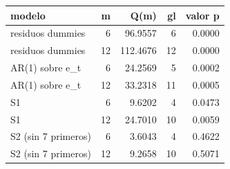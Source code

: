 \begin{tabular}{lrrrr}
\toprule
modelo & m & Q(m) & gl & valor p \\
\midrule
residuos dummies & 6 & 96.9557 & 6 & 0.0000 \\
residuos dummies & 12 & 112.4676 & 12 & 0.0000 \\
AR(1) sobre e\_t & 6 & 24.2569 & 5 & 0.0002 \\
AR(1) sobre e\_t & 12 & 33.2318 & 11 & 0.0005 \\
S1 & 6 & 9.6202 & 4 & 0.0473 \\
S1 & 12 & 24.7010 & 10 & 0.0059 \\
S2 (sin 7 primeros) & 6 & 3.6043 & 4 & 0.4622 \\
S2 (sin 7 primeros) & 12 & 9.2658 & 10 & 0.5071 \\
\bottomrule
\end{tabular}
